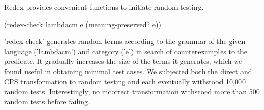 Redex provides convenient functions to initiate random testing.

\begin{schemedisplay}
(redex-check lambdacm e (meaning-preserved? e))
\end{schemedisplay}

\scheme'redex-check' generates random terms according to the grammar of the given language (\scheme'lambdacm') and category (\scheme'e') in search of counterexamples to the predicate. It gradually increases the size of the terms it generates, which we found useful in obtaining minimal test cases. We subjected both the direct and CPS transformation to random testing and each eventually withstood 10,000 random tests. Interestingly, no incorrect transformation withstood more than 500 random tests before failing.


